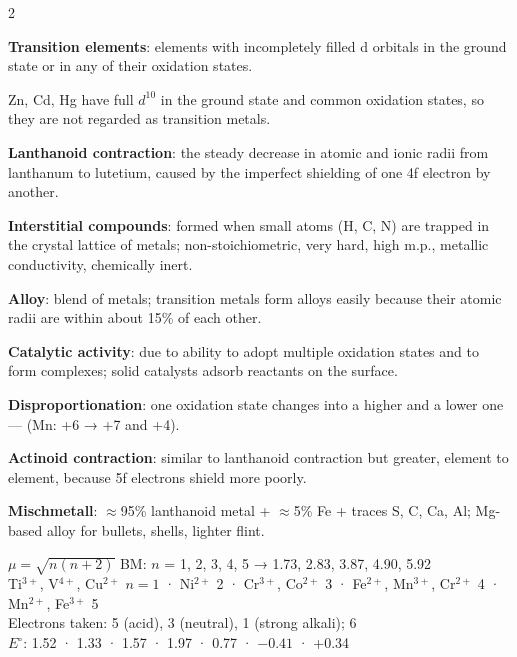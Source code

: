 \documentclass[10pt,a4paper]{extarticle}
\begin{document}
\begin{multicols}{2}
\begin{fl}
\item \textbf{Transition elements}: elements with incompletely filled d orbitals in the ground state or in any of their oxidation states.
\item Zn, Cd, Hg have full $d^{10}$ in the ground state and common oxidation states, so they are not regarded as transition metals.
\item \textbf{Lanthanoid contraction}: the steady decrease in atomic and ionic radii from lanthanum to lutetium, caused by the imperfect shielding of one 4f electron by another.
\item \textbf{Interstitial compounds}: formed when small atoms (H, C, N) are trapped in the crystal lattice of metals; non-stoichiometric, very hard, high m.p., metallic conductivity, chemically inert.
\item \textbf{Alloy}: blend of metals; transition metals form alloys easily because their atomic radii are within about 15\% of each other.
\item \textbf{Catalytic activity}: due to ability to adopt multiple oxidation states and to form complexes; solid catalysts adsorb reactants on the surface.
\item \textbf{Disproportionation}: one oxidation state changes into a higher and a lower one —  (Mn: +6 → +7 and +4).
\item \textbf{Actinoid contraction}: similar to lanthanoid contraction but greater, element to element, because 5f electrons shield more poorly.
\item \textbf{Mischmetall}: $\approx$95\% lanthanoid metal + $\approx$5\% Fe + traces S, C, Ca, Al; Mg-based alloy for bullets, shells, lighter flint.
\end{fl}

\begin{kbox}
$\mu=\sqrt{n(n+2)}$ BM: $n$ = 1, 2, 3, 4, 5 → 1.73, 2.83, 3.87, 4.90, 5.92\\[1pt]
Ti$^{3+}$, V$^{4+}$, Cu$^{2+}$ $n=1$ · Ni$^{2+}$ 2 · Cr$^{3+}$, Co$^{2+}$ 3 · Fe$^{2+}$, Mn$^{3+}$, Cr$^{2+}$ 4 · Mn$^{2+}$, Fe$^{3+}$ 5\\[1pt]
Electrons taken:  5 (acid), 3 (neutral), 1 (strong alkali);  6\\[1pt]
$E^\circ$:  1.52 ·  1.33 ·  1.57 ·  1.97 ·  0.77 ·  $-0.41$ ·  +0.34
\end{kbox}


\end{multicols}
\end{document}
